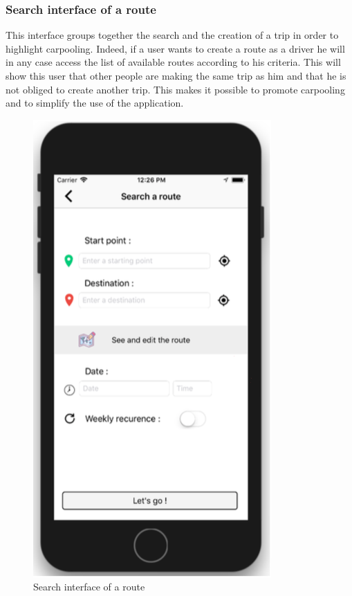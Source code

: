 \subsubsection{Search interface of a route}

This interface groups together the search and the creation of a trip in order to highlight carpooling. Indeed, if a user wants to create a route as a driver he will in any case access the list of available routes according to his criteria. This will show this user that other people are making the same trip as him and that he is not obliged to create another trip. This makes it possible to promote carpooling and to simplify the use of the application.

\begin{figure}[h!]
\begin{center}
\includegraphics[scale = 0.3]{diagrams/SearchInterfaceRoute.png} 
\end{center}
\caption{Search interface of a route}
\end{figure}

